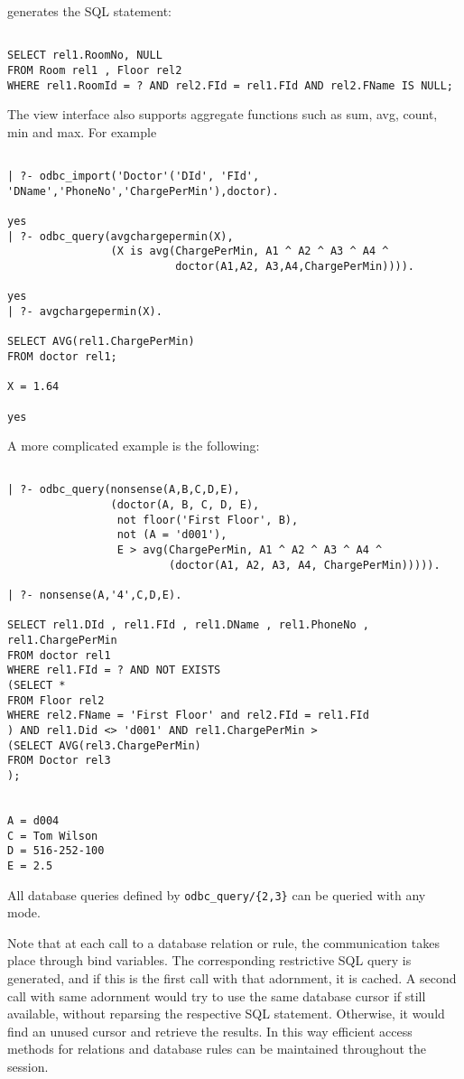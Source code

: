 generates the SQL statement:
\begin{verbatim}

SELECT rel1.RoomNo, NULL
FROM Room rel1 , Floor rel2
WHERE rel1.RoomId = ? AND rel2.FId = rel1.FId AND rel2.FName IS NULL;
\end{verbatim}

The view interface also supports aggregate functions such as sum, avg,
count, min and max.  For example
\begin{verbatim}

| ?- odbc_import('Doctor'('DId', 'FId', 'DName','PhoneNo','ChargePerMin'),doctor).

yes
| ?- odbc_query(avgchargepermin(X),
                (X is avg(ChargePerMin, A1 ^ A2 ^ A3 ^ A4 ^ 
                          doctor(A1,A2, A3,A4,ChargePerMin)))).

yes
| ?- avgchargepermin(X).

SELECT AVG(rel1.ChargePerMin)
FROM doctor rel1;

X = 1.64

yes
\end{verbatim}

A more complicated example is the following:
\begin{verbatim}

| ?- odbc_query(nonsense(A,B,C,D,E),
                (doctor(A, B, C, D, E), 
                 not floor('First Floor', B), 
                 not (A = 'd001'), 
                 E > avg(ChargePerMin, A1 ^ A2 ^ A3 ^ A4 ^
                         (doctor(A1, A2, A3, A4, ChargePerMin))))).

| ?- nonsense(A,'4',C,D,E).

SELECT rel1.DId , rel1.FId , rel1.DName , rel1.PhoneNo , rel1.ChargePerMin
FROM doctor rel1
WHERE rel1.FId = ? AND NOT EXISTS
(SELECT *
FROM Floor rel2
WHERE rel2.FName = 'First Floor' and rel2.FId = rel1.FId
) AND rel1.Did <> 'd001' AND rel1.ChargePerMin >
(SELECT AVG(rel3.ChargePerMin)
FROM Doctor rel3
);


A = d004
C = Tom Wilson
D = 516-252-100
E = 2.5
\end{verbatim}

All database queries defined by {\tt odbc\_query/\{2,3\}} can be
queried with any mode.

Note that at each call to a database relation or rule, the
communication takes place through bind variables.  The corresponding
restrictive SQL query is generated, and if this is the first call with
that adornment, it is cached.  A second call with same adornment would
try to use the same database cursor if still available, without
reparsing the respective SQL statement.  Otherwise, it would find an
unused cursor and retrieve the results.  In this way efficient access
methods for relations and database rules can be maintained throughout
the session.


